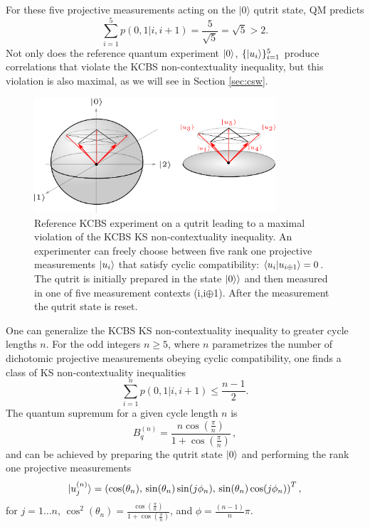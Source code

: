 For these five projective measurements acting on the $\vert 0\rangle$ qutrit state, QM predicts \begin{equation*}
\sum_{i=1}^5p(0,1\vert i, i+1)=\frac{5}{\sqrt{5}}=\sqrt{5}>2.    
\end{equation*}
Not only does the reference quantum experiment $\ket{0}$, $\{\ket{u_i}\}_{i=1}^5$ produce correlations that violate the KCBS non-contextuality inequality, but this violation is also maximal, as we will see in Section \ref{sec:csw}.

\begin{figure}
    \centering
    \includegraphics[width=0.8\textwidth]{images/kcbsref.png}
    \caption{Reference KCBS experiment on a qutrit leading to a maximal violation of the KCBS KS non-contextuality inequality. An experimenter can freely choose between five rank one projective measurements $\ket{u_i}$ that satisfy cyclic compatibility: $\bra{u_i}\ket{ u_{i\oplus1}} = 0$. The qutrit is initially prepared in the state $\ket{0\rangle}$ and then measured in one of five measurement contexts (i,i$\oplus$1). After the measurement the qutrit state is reset.}
    \label{fig:kcbsref}
\end{figure}

One can generalize the KCBS KS non-contextuality inequality to greater cycle lengths $n$. For the odd integers $n\geq 5$, where $n$ parametrizes the number of dichotomic projective measurements obeying cyclic compatibility, one finds a class of KS non-contextuality inequalities \cite{Bharti2019}
\begin{equation}
    \label{eqn:oddncycleclass}
    \sum_{i=1}^n p(0,1\vert i,i+1) \leq \frac{n-1}{2}.
\end{equation}
The quantum supremum for a given cycle length $n$ is
\begin{equation}
\label{eqn:ncyclequsup}
B_q^{(n)}=\frac{n\cos(\frac{\pi}{n})}{1+\cos(\frac{\pi}{n})}\,,
\end{equation} and can be achieved by preparing the qutrit state $\ket{0}$ and performing the rank one projective measurements
\begin{equation}
\label{eqn:ncycleideal}
\vert u_j^{(n)}\rangle = \left(\cos(\theta_n),\thinspace\sin(\theta_n)\sin(j\phi_n),\thinspace\sin(\theta_n)\cos(j\phi_n)\right)^T,
\end{equation}
for $j=1\dots n$, $\displaystyle\cos^2(\theta_n)=\frac{\cos(\frac{\pi}{n})}{1+\cos(\frac{\pi}{n})}$, and $\displaystyle\phi=\frac{(n-1)}{n}\pi$.

